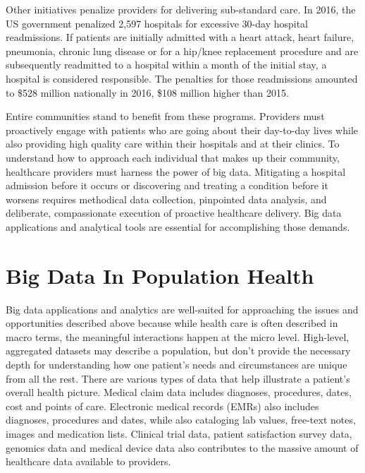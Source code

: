 \documentclass[sigconf]{acmart}
\begin{document}
 Other initiatives penalize providers for delivering sub-standard care. In 2016, the US government penalized 2,597 hospitals for excessive 30-day hospital readmissions\cite{editor05}. If patients are initially admitted with a heart attack, heart failure, pneumonia, chronic lung disease or for a hip/knee replacement procedure and are subsequently readmitted to a hospital within a month of the initial stay, a hospital is considered responsible. The penalties for those readmissions amounted to \$528 million nationally in 2016, \$108 million higher than 2015\cite{editor05}.

 Entire communities stand to benefit from these programs. Providers must proactively engage with patients who are going about their day-to-day lives while also providing high quality care within their hospitals and at their clinics. To understand how to approach each individual that makes up their community, healthcare providers must harness the power of big data. Mitigating a hospital admission before it occurs or discovering and treating a condition before it worsens requires methodical data collection, pinpointed data analysis, and deliberate, compassionate execution of proactive healthcare delivery. Big data applications and analytical tools are essential for accomplishing those demands.

\section{Big Data In Population Health}

 Big data applications and analytics are well-suited for approaching the issues and opportunities described above because while health care is often described in macro terms, the meaningful interactions happen at the micro level. High-level, aggregated datasets may describe a population, but don't provide the necessary depth for understanding how one patient's needs and circumstances are unique from all the rest. There are various types of data that help illustrate a patient's overall health picture. Medical claim data includes diagnoses, procedures, dates, cost and points of care. Electronic medical records (EMRs) also includes diagnoses, procedures and dates, while also cataloging lab values, free-text notes, images and medication lists. Clinical trial data, patient satisfaction survey data, genomics data and medical device data also contributes to the massive amount of healthcare data available to providers\cite{editor14}. 
\end{document}
